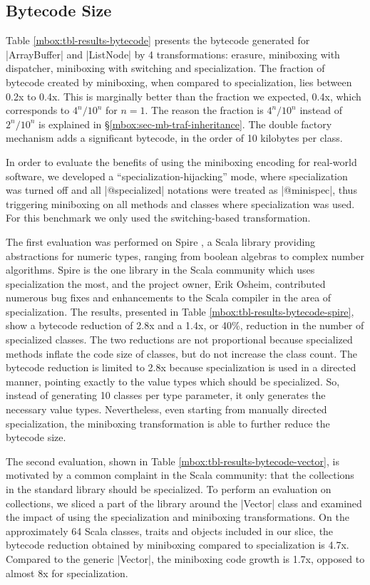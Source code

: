 \subsection{Bytecode Size}
\label{mbox:subsec-eval-size}

Table \ref{mbox:tbl-results-bytecode} presents the bytecode generated for |ArrayBuffer| and |ListNode| by 4 transformations: erasure, miniboxing with dispatcher, miniboxing with switching and specialization. The fraction of bytecode created by miniboxing, when compared to specialization, lies between 0.2x to 0.4x. This is marginally better than the fraction we expected, 0.4x, which corresponds to $4^n / 10^n$ for $n=1$. The reason the fraction is $4^n / 10^n$ instead of $2^n / 10^n$ is explained in \S \ref{mbox:sec-mb-traf-inheritance}. The double factory mechanism adds a significant bytecode, in the order of 10 kilobytes per class.

In order to evaluate the benefits of using the miniboxing encoding for real-world software, we developed a ``specialization-hijacking'' mode, where specialization was turned off and all |@specialized| notations were treated as |@minispec|, thus triggering miniboxing on all methods and classes where specialization was used. For this benchmark we only used the switching-based transformation.
 
The first evaluation was performed on Spire \cite{erik-spire}, a Scala library providing abstractions for numeric types, ranging from boolean algebras to complex number algorithms. Spire is the one library in the Scala community which uses specialization the most, and the project owner, Erik Osheim, contributed numerous bug fixes and enhancements to the Scala compiler in the area of specialization. The results, presented in Table \ref{mbox:tbl-results-bytecode-spire}, show a bytecode reduction of 2.8x and a 1.4x, or 40\%, reduction in the number of specialized classes. The two reductions are not proportional because specialized methods inflate the code size of classes, but do not increase the class count. The bytecode reduction is limited to 2.8x because specialization is used in a directed manner, pointing exactly to the value types which should be specialized. So, instead of generating 10 classes per type parameter, it only generates the necessary value types. Nevertheless, even starting from manually directed specialization, the miniboxing transformation is able to further reduce the bytecode size.    

The second evaluation, shown in Table \ref{mbox:tbl-results-bytecode-vector}, is motivated by a common complaint in the Scala community: that the collections in the standard library should be specialized. To perform an evaluation on collections, we sliced a part of the library around the |Vector| class and examined the impact of using the specialization and miniboxing transformations. On the approximately 64 Scala classes, traits and objects included in our slice, the bytecode reduction obtained by miniboxing compared to specialization is 4.7x. Compared to the generic |Vector|, the miniboxing code growth is 1.7x, opposed to almost 8x for specialization. 

